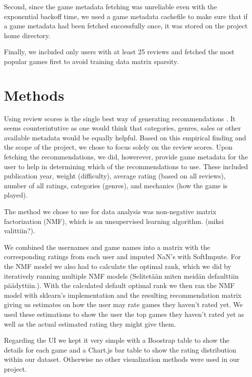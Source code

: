 \documentclass[a4paper,12pt,bibliography=totoc,numbers=noenddot,sfdefaults=false,abstract=true,notitlepage]{scrartcl} %
\begin{document}
	Second, since the game metadata fetching was unreliable even with the exponential backoff time, we used a game metadata cachefile to make sure that if a game metadata had been fetched successfully once, it was stored  on the project home directory.

	Finally, we included only users with at least 25 reviews and fetched the most popular games first to avoid training data matrix sparsity.
	
	
	\section{Methods}\label{methods}

	Using review scores is the single best way of generating recommendations \autocite{epsteinRangeWhyGeneralists2021}. It seems counterintutive as one would think that categories, genres, sales or other available metadata would be equally helpful. Based on this empirical finding and the scope of the project, we chose to focus solely on the review scores. Upon fetching the recommendations, we did, howerever, provide game metadata for the user to help in determining which of the recommendations to use. These included publication year, weight (difficulty), average rating (based on all reviews), number of all ratings, categories (genres), and mechanics (how the game is played). 

	The method we chose to use for data analysis was non-negative matrix factorization (NMF), which is an unsupervised learning algorithm. (miksi valittiin?). 
	
	We combined the usernames and game names into a matrix with the corresponding ratings from each user and imputed NaN's with SoftImpute. For the NMF model we also had to calculate the optimal rank, which we did by iteratively running multiple NMF models (Selitetään miten meidän defaulttiin päädyttiin.). With the calculated default optimal rank we then ran the NMF model with sklearn's implementation and the resulting recommendation matrix giving us estimates on how the user may rate games they haven't rated yet. We used these estimations to show the user the top games they haven't rated yet as well as the actual estimated rating they might give them.

	
	Regarding the UI we kept it very simple with a Boostrap table to show the details for each game and a Chart.js bar table to show the rating distribution within our dataset. Otherwise no other visualization methods were used in our project.
	
\end{document}
